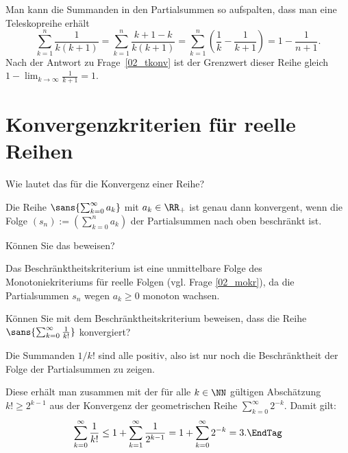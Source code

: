 \begin{antwort}
  Man kann die Summanden in den 
  Partialsummen so aufspalten, dass man eine Teleskopreihe erhält 
  \[
  \sum_{k=1}^n \frac{1}{k(k+1)} = 
  \sum_{k=1}^n \frac{k+1-k}{k(k+1)}=
  \sum_{k=1}^n \left( \frac{1}{k}-\frac{1}{k+1} \right)=1-\frac{1}{n+1}.
  \]
  Nach der Antwort zu Frage~\ref{02_tkonv} ist der Grenzwert 
  dieser Reihe gleich $1-\lim_{k\to\infty} \frac{1}{k+1}=1$. \AntEnd
\end{antwort}


\section{Konvergenzkriterien für reelle Reihen}

\begin{frage}
  \label{02_besc}
  Wie lautet das  
  für die Konvergenz einer Reihe?
\end{frage}

\begin{antwort}
  Die Reihe $\sans{\sum_{k=0}^\infty a_k}$ mit $a_k \in \RR_+$  
  ist genau dann konvergent, wenn 
  die Folge $(s_n):=\left(  \sum_{k=0}^n a_k \right )$ 
  der Partialsummen nach oben beschränkt ist.
\end{antwort}

\begin{frage}
   Können Sie das 
    beweisen?
\end{frage}

\begin{antwort}
  \Ant Das Beschränktheitskriterium ist eine unmittelbare Folge 
  des Monotoniekriteriums für reelle Folgen 
  (vgl. Frage \ref{02_mokr}), 
  da die Partialsummen $s_n$ wegen $a_k\ge 0$ monoton wachsen.
  \AntEnd  
\end{antwort}


\begin{frage}\label{02_rexp}
  Können Sie mit dem Beschränktheitskriterium beweisen, dass die Reihe 
  $\sans{\sum_{k=0}^\infty \frac{1}{k!}}$ konvergiert?
\end{frage}

\begin{antwort}
  Die Summanden $1/k!$ sind alle positiv, 
  also ist nur noch die Beschränktheit der Folge der Partialsummen zu zeigen. 
  
  Diese erhält man zusammen mit der für alle $k\in\NN$ gültigen 
  Abschätzung $k!\ge 2^{k-1}$ aus der Konvergenz der geometrischen Reihe 
  $\sum_{k=0}^\infty 2^{-k}$. Damit gilt: 
  \begin{equation}
    \sum_{k=0}^\infty \frac{1}{k!} \le 
    1 + \sum_{k=1}^\infty \frac{1}{2^{k-1}} = 
    1 + \sum_{k=0}^\infty 2^{-k} = 3.
    \EndTag
  \end{equation}
\end{antwort}


